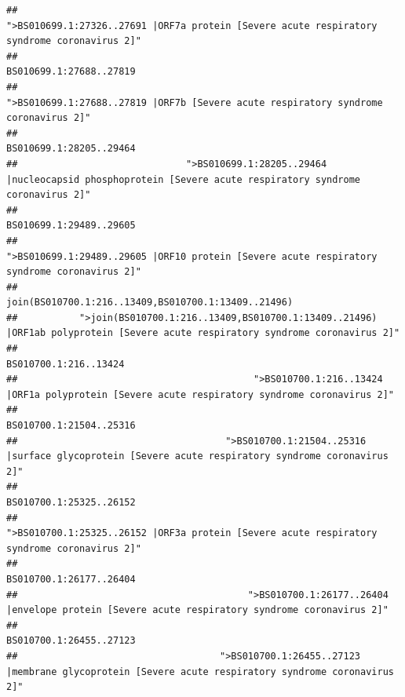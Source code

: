 \documentclass[
]{article}
\begin{document}
\begin{verbatim}
##                                            ">BS010699.1:27326..27691 |ORF7a protein [Severe acute respiratory syndrome coronavirus 2]" 
##                                                                                                                BS010699.1:27688..27819 
##                                                    ">BS010699.1:27688..27819 |ORF7b [Severe acute respiratory syndrome coronavirus 2]" 
##                                                                                                                BS010699.1:28205..29464 
##                              ">BS010699.1:28205..29464 |nucleocapsid phosphoprotein [Severe acute respiratory syndrome coronavirus 2]" 
##                                                                                                                BS010699.1:29489..29605 
##                                            ">BS010699.1:29489..29605 |ORF10 protein [Severe acute respiratory syndrome coronavirus 2]" 
##                                                                                    join(BS010700.1:216..13409,BS010700.1:13409..21496) 
##           ">join(BS010700.1:216..13409,BS010700.1:13409..21496) |ORF1ab polyprotein [Severe acute respiratory syndrome coronavirus 2]" 
##                                                                                                                  BS010700.1:216..13424 
##                                          ">BS010700.1:216..13424 |ORF1a polyprotein [Severe acute respiratory syndrome coronavirus 2]" 
##                                                                                                                BS010700.1:21504..25316 
##                                     ">BS010700.1:21504..25316 |surface glycoprotein [Severe acute respiratory syndrome coronavirus 2]" 
##                                                                                                                BS010700.1:25325..26152 
##                                            ">BS010700.1:25325..26152 |ORF3a protein [Severe acute respiratory syndrome coronavirus 2]" 
##                                                                                                                BS010700.1:26177..26404 
##                                         ">BS010700.1:26177..26404 |envelope protein [Severe acute respiratory syndrome coronavirus 2]" 
##                                                                                                                BS010700.1:26455..27123 
##                                    ">BS010700.1:26455..27123 |membrane glycoprotein [Severe acute respiratory syndrome coronavirus 2]" 

\end{verbatim}
\end{document}
